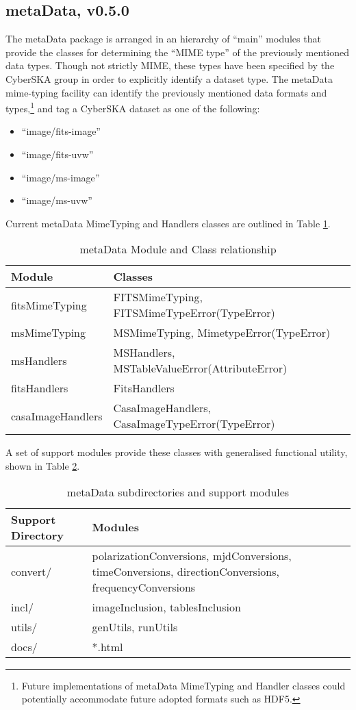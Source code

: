 \subsection{metaData, v0.5.0}
The metaData package \citep{and_2011} is arranged in an hierarchy of ``main'' modules that provide the classes for determining the ``MIME type'' of the previously mentioned data types. Though not strictly MIME, these types have been specified by the CyberSKA group in order to explicitly identify a dataset type. The metaData mime-typing facility can identify the previously mentioned data formats and types,\footnote{Future implementations of metaData MimeTyping and Handler classes could potentially accommodate future adopted formats such as HDF5.} and tag a CyberSKA dataset as one of the following:
\begin{itemize}
\item ``image/fits-image''
\item ``image/fits-uvw''
\item ``image/ms-image''
\item ``image/ms-uvw''
\end{itemize}
Current metaData MimeTyping and Handlers classes are outlined in Table \ref{tab:mods}.
\begin{table}[htbp]
  \centering
  \begin{tabular}{|l|p{9.0cm}|} 
    \hline
    \sc \textbf{Module} & \textbf{Classes} \\
    \hline
    fitsMimeTyping & FITSMimeTyping, FITSMimeTypeError(TypeError) \\
    msMimeTyping   & MSMimeTyping,   MimetypeError(TypeError) \\
    msHandlers     & MSHandlers,     MSTableValueError(AttributeError) \\
    fitsHandlers   & FitsHandlers \\
    casaImageHandlers  & CasaImageHandlers, CasaImageTypeError(TypeError)\\
    \hline
  \end{tabular}
  \caption{metaData Module and Class relationship}
  \label{tab:mods}
\end{table}

A set of support modules provide these classes with generalised functional utility, shown in Table \ref{tab:subdirs}.
\begin{table}[htbp]
  \centering
  \begin{tabular}{|l|p{9.0cm}|} 
    \hline
    \sc \textbf{Support Directory} & \textbf{Modules} \\
    \hline
    convert/ & polarizationConversions, mjdConversions, timeConversions,
               directionConversions, frequencyConversions \\
    incl/   &  imageInclusion, tablesInclusion \\
    utils/  &  genUtils, runUtils \\
    \hline
    docs/   &  *.html\\
    \hline
  \end{tabular}
  \caption{metaData subdirectories and support modules}
  \label{tab:subdirs}
\end{table}

